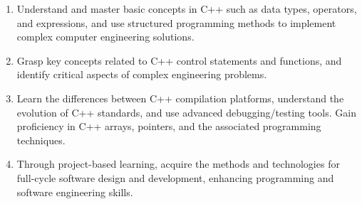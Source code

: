 \begin{enumerate}[topsep=0pt, partopsep=0pt, parsep=0pt, itemsep=1pt]
    \item Understand and master basic concepts in C++ such as data types, operators, and expressions, and use structured programming methods to implement complex computer engineering solutions.
    \item Grasp key concepts related to C++ control statements and functions, and identify critical aspects of complex engineering problems.
    \item Learn the differences between C++ compilation platforms, understand the evolution of C++ standards, and use advanced debugging/testing tools. Gain proficiency in C++ arrays, pointers, and the associated programming techniques.
    \item Through project-based learning, acquire the methods and technologies for full-cycle software design and development, enhancing programming and software engineering skills.
\end{enumerate}
